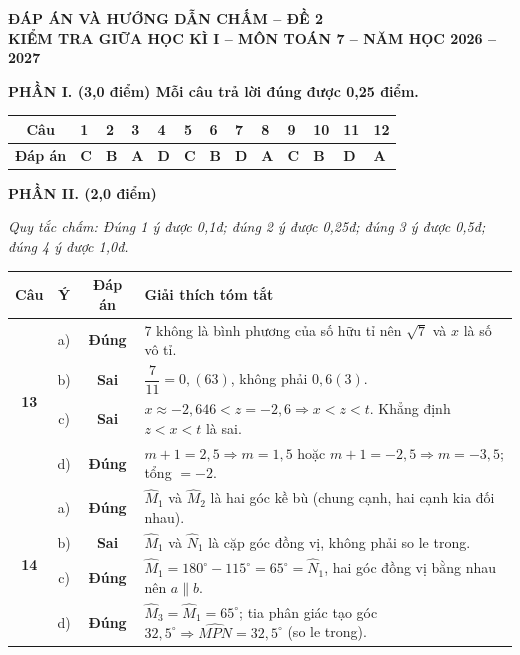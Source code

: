\documentclass[11pt,a4paper]{article}
\begin{document}
\begin{center}
  \textbf{\large ĐÁP ÁN VÀ HƯỚNG DẪN CHẤM -- ĐỀ 2}\\[1mm]
  \textbf{\large KIỂM TRA GIỮA HỌC KÌ I -- MÔN TOÁN 7 -- NĂM HỌC 2026 -- 2027}
\end{center}

\vspace{1mm}
\noindent\textbf{\large PHẦN I. (3,0 điểm) Mỗi câu trả lời đúng được 0,25 điểm.}
\vspace{1mm}

\noindent
\begin{tabularx}{\linewidth}{|c|*{12}{Y|}}
\hline
\textbf{Câu} & 1 & 2 & 3 & 4 & 5 & 6 & 7 & 8 & 9 & 10 & 11 & 12 \\ \hline
\textbf{Đáp án} & \textbf{C} & \textbf{B} & \textbf{A} & \textbf{D} & \textbf{C} & \textbf{B} & \textbf{D} & \textbf{A} & \textbf{C} & \textbf{B} & \textbf{D} & \textbf{A} \\ \hline
\end{tabularx}

\vspace{2.5mm}
\noindent\textbf{\large PHẦN II. (2,0 điểm)}
\vspace{0.5mm}

\noindent\textit{Quy tắc chấm: Đúng 1 ý được 0,1đ; đúng 2 ý được 0,25đ; đúng 3 ý được 0,5đ; đúng 4 ý được 1,0đ.}

\vspace{1mm}
\noindent
\begin{tabularx}{\linewidth}{|c|c|c|X|}
\hline
\textbf{Câu} & \textbf{Ý} & \textbf{Đáp án} & \textbf{Giải thích tóm tắt} \\ \hline
\multirow{4}{*}{\textbf{13}} & a) & \textbf{Đúng} & 7 không là bình phương của số hữu tỉ nên $\sqrt{7}$ và $x$ là số vô tỉ. \\ \cline{2-4}
& b) & \textbf{Sai} & $\dfrac{7}{11} = 0,(63)$, không phải $0,6(3)$. \\ \cline{2-4}
& c) & \textbf{Sai} & $x \approx -2,646 < z = -2,6 \Rightarrow x < z < t$. Khẳng định $z < x < t$ là sai. \\ \cline{2-4}
& d) & \textbf{Đúng} & $m + 1 = 2,5 \Rightarrow m = 1,5$ hoặc $m + 1 = -2,5 \Rightarrow m = -3,5$; tổng $= -2$. \\ \hline
\multirow{4}{*}{\textbf{14}} & a) & \textbf{Đúng} & $\widehat{M}_1$ và $\widehat{M}_2$ là hai góc kề bù (chung cạnh, hai cạnh kia đối nhau). \\ \cline{2-4}
& b) & \textbf{Sai} & $\widehat{M}_1$ và $\widehat{N}_1$ là cặp góc đồng vị, không phải so le trong. \\ \cline{2-4}
& c) & \textbf{Đúng} & $\widehat{M}_1 = 180^\circ - 115^\circ = 65^\circ = \widehat{N}_1$, hai góc đồng vị bằng nhau nên $a \parallel b$. \\ \cline{2-4}
& d) & \textbf{Đúng} & $\widehat{M}_3 = \widehat{M}_1 = 65^\circ$; tia phân giác tạo góc $32,5^\circ \Rightarrow \widehat{MPN} = 32,5^\circ$ (so le trong). \\ \hline
\end{tabularx}
\end{document}
